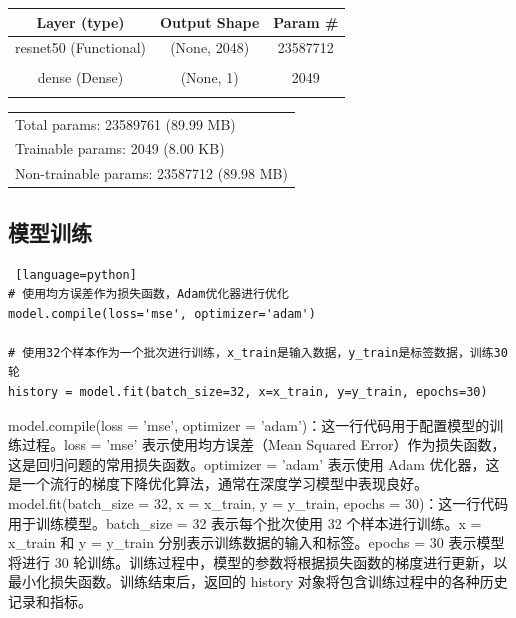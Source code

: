 \documentclass{article}
\begin{document}
\begin{tabular}{ccc}%
\toprule %
Layer (type)& Output Shape& Param \#\\
\midrule %
resnet50 (Functional)& (None, 2048)& 23587712\\
\\
dense (Dense)& (None, 1)& 2049\\
\\
\bottomrule %
\end{tabular}\par
\begin{tabular}{l}
\toprule %
Total params: 23589761 (89.99 MB)\\
Trainable params: 2049 (8.00 KB)\\
Non-trainable params: 23587712 (89.98 MB)\\
\bottomrule %
\end{tabular}

\subsection{模型训练}
\begin{lstlisting} [language=python]
# 使用均方误差作为损失函数，Adam优化器进行优化  
model.compile(loss='mse', optimizer='adam')  
  
# 使用32个样本作为一个批次进行训练，x_train是输入数据，y_train是标签数据，训练30轮  
history = model.fit(batch_size=32, x=x_train, y=y_train, epochs=30)
\end{lstlisting}

model.compile(loss = 'mse', optimizer = 'adam')：这一行代码用于配置模型的训练过程。loss = 'mse' 表示使用均方误差（Mean Squared Error）作为损失函数，这是回归问题的常用损失函数。optimizer = 'adam' 表示使用 Adam 优化器，这是一个流行的梯度下降优化算法，通常在深度学习模型中表现良好。 model.fit(batch\_size = 32, x = x\_train, y = y\_train, epochs = 30)：这一行代码用于训练模型。batch\_size = 32 表示每个批次使用 32 个样本进行训练。x = x\_train 和 y = y\_train 分别表示训练数据的输入和标签。epochs = 30 表示模型将进行 30 轮训练。训练过程中，模型的参数将根据损失函数的梯度进行更新，以最小化损失函数。训练结束后，返回的 history 对象将包含训练过程中的各种历史记录和指标。\par
\end{document}
